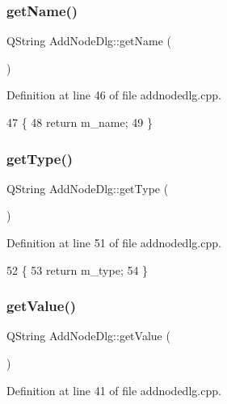 \subsubsection{\texorpdfstring{get\+Name()}{getName()}}
{\footnotesize\ttfamily Q\+String Add\+Node\+Dlg\+::get\+Name (\begin{DoxyParamCaption}{ }\end{DoxyParamCaption})}



Definition at line 46 of file addnodedlg.\+cpp.


\begin{DoxyCode}
47 \{
48     \textcolor{keywordflow}{return} m\_name;
49 \}
\end{DoxyCode}
\mbox{\label{class_add_node_dlg_a71a6ea544a25bea1ab8d540f7ad72629}} 
\subsubsection{\texorpdfstring{get\+Type()}{getType()}}
{\footnotesize\ttfamily Q\+String Add\+Node\+Dlg\+::get\+Type (\begin{DoxyParamCaption}{ }\end{DoxyParamCaption})}



Definition at line 51 of file addnodedlg.\+cpp.


\begin{DoxyCode}
52 \{
53     \textcolor{keywordflow}{return} m\_type;
54 \}
\end{DoxyCode}
\mbox{\label{class_add_node_dlg_a68b5c4fdf57e5fd7545df5b6f1dfbccd}} 
\subsubsection{\texorpdfstring{get\+Value()}{getValue()}}
{\footnotesize\ttfamily Q\+String Add\+Node\+Dlg\+::get\+Value (\begin{DoxyParamCaption}{ }\end{DoxyParamCaption})}



Definition at line 41 of file addnodedlg.\+cpp.


